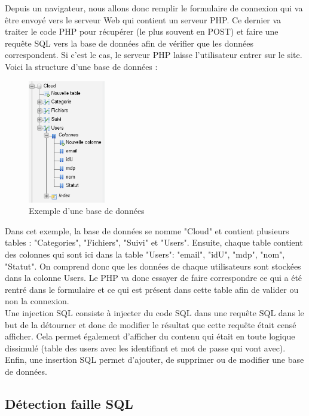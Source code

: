 Depuis un navigateur, nous allons donc remplir le formulaire de connexion qui va être envoyé vers le serveur Web qui contient un serveur PHP. Ce dernier va traiter le code PHP pour récupérer (le plus souvent en POST) et faire une requête SQL vers la base de données afin de vérifier que les données correspondent. Si c'est le cas, le serveur PHP laisse l'utilisateur entrer sur le site.\\
Voici la structure d'une base de données :

\begin{figure}[htp!]
  \centering
  \setlength\figureheight{7cm}
  \setlength\figurewidth{9cm}
  \includegraphics[width=0.3\textwidth]{oui/Ancien/imangeancien/SQLi/BD.PNG}
  \caption{Exemple d'une base de données}
  \label{fig:courbe-tikz}
\end{figure}

Dans cet exemple, la base de données se nomme "Cloud" et contient plusieurs tables : "Categories", "Fichiers", "Suivi" et "Users". Ensuite, chaque table contient des colonnes qui sont ici dans la table "Users": "email", "idU", "mdp", "nom", "Statut". On comprend donc que les données de chaque utilisateurs sont stockées dans la colonne Users. Le PHP va donc essayer de faire correspondre ce qui a été rentré dans le formulaire et ce qui est présent dans cette table afin de valider ou non la connexion.\\
Une injection SQL consiste à injecter du code SQL dans une requête SQL dans le but de la détourner et donc de modifier le résultat que cette requête était censé afficher. Cela permet également d’afficher du contenu qui était en toute logique dissimulé (table des users avec les identifiant et mot de passe qui vont avec). Enfin, une insertion SQL permet d’ajouter, de supprimer ou de modifier une base de données.

\subsection{Détection faille SQL}

